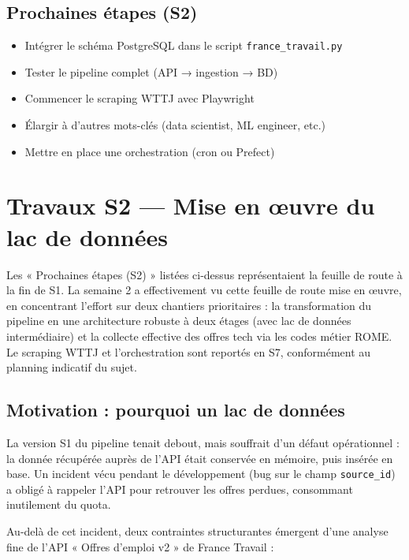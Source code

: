 \documentclass[12pt, a4paper]{article}
\begin{document}
\subsection{Prochaines étapes (S2)}
\begin{itemize}
    \item Intégrer le schéma PostgreSQL dans le script \texttt{france\_travail.py}
    \item Tester le pipeline complet (API → ingestion → BD)
    \item Commencer le scraping WTTJ avec Playwright
    \item Élargir à d'autres mots-clés (data scientist, ML engineer, etc.)
    \item Mettre en place une orchestration (cron ou Prefect)
\end{itemize}

\section{Travaux S2 — Mise en œuvre du lac de données}

Les « Prochaines étapes (S2) » listées ci-dessus représentaient la feuille de route à la fin de S1. La semaine 2 a effectivement vu cette feuille de route mise en œuvre, en concentrant l'effort sur deux chantiers prioritaires : la transformation du pipeline en une architecture robuste à deux étages (avec lac de données intermédiaire) et la collecte effective des offres tech via les codes métier ROME. Le scraping WTTJ et l'orchestration sont reportés en S7, conformément au planning indicatif du sujet.

\subsection{Motivation : pourquoi un lac de données}

La version S1 du pipeline tenait debout, mais souffrait d'un défaut opérationnel : la donnée récupérée auprès de l'API était conservée en mémoire, puis insérée en base. Un incident vécu pendant le développement (bug sur le champ \texttt{source\_id}) a obligé à rappeler l'API pour retrouver les offres perdues, consommant inutilement du quota.

Au-delà de cet incident, deux contraintes structurantes émergent d'une analyse fine de l'API « Offres d'emploi v2 » de France Travail :
\end{document}
